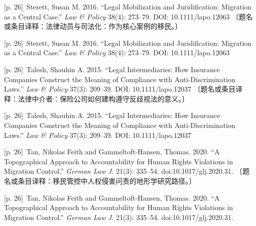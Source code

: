 \documentclass[10pt,a4paper]{article}
\begin{document}
\noindent\begin{minipage}{\textwidth}\begin{minipage}[t]{\dimexpr.5\textwidth-4mm\relax}{\scriptsize\color{gray} [p. 26]}\ Sterett, Susan M. 2016. “Legal Mobilization and Juridification: Migration as a Central Case.” \textit{Law \& Policy} 38(4): 273–79. DOI: 10.1111/lapo.12063 〔题名或条目译释：法律动员与司法化：作为核心案例的移民。〕\par\end{minipage}\hfill\begin{minipage}[t]{\dimexpr.5\textwidth-4mm\relax}{\scriptsize\color{gray} [p. 26]}\ Sterett, Susan M. 2016. “Legal Mobilization and Juridification: Migration as a Central Case.” \textit{Law \& Policy} 38(4): 273–79. DOI: 10.1111/lapo.12063\par\end{minipage}\end{minipage}\par
\noindent\begin{minipage}{\textwidth}\begin{minipage}[t]{\dimexpr.5\textwidth-4mm\relax}{\scriptsize\color{gray} [p. 26]}\ Talesh, Shauhin A. 2015. “Legal Intermediaries: How Insurance Companies Construct the Meaning of Compliance with Anti-Discrimination Laws.” \textit{Law \& Policy} 37(3): 209–39. DOI: 10.1111/lapo.12037 〔题名或条目译释：法律中介者：保险公司如何建构遵守反歧视法的意义。〕\par\end{minipage}\hfill\begin{minipage}[t]{\dimexpr.5\textwidth-4mm\relax}{\scriptsize\color{gray} [p. 26]}\ Talesh, Shauhin A. 2015. “Legal Intermediaries: How Insurance Companies Construct the Meaning of Compliance with Anti-Discrimination Laws.” \textit{Law \& Policy} 37(3): 209–39. DOI: 10.1111/lapo.12037\par\end{minipage}\end{minipage}\par
\noindent\begin{minipage}{\textwidth}\begin{minipage}[t]{\dimexpr.5\textwidth-4mm\relax}{\scriptsize\color{gray} [p. 26]}\ Tan, Nikolas Feith and Gammeltoft-Hansen, Thomas. 2020. “A Topographical Approach to Accountability for Human Rights Violations in Migration Control.” \textit{German Law J.} 21(3): 335–54. doi:10.1017/glj.2020.31. 〔题名或条目译释：移民管控中人权侵害问责的地形学研究路径。〕\par\end{minipage}\hfill\begin{minipage}[t]{\dimexpr.5\textwidth-4mm\relax}{\scriptsize\color{gray} [p. 26]}\ Tan, Nikolas Feith and Gammeltoft-Hansen, Thomas. 2020. “A Topographical Approach to Accountability for Human Rights Violations in Migration Control.” \textit{German Law J.} 21(3): 335–54. doi:10.1017/glj.2020.31.\par\end{minipage}\end{minipage}\par
\end{document}
